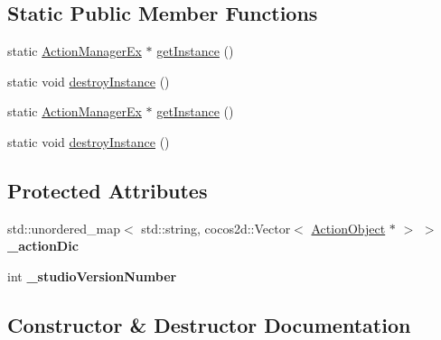 \subsection*{Static Public Member Functions}
\begin{DoxyCompactItemize}
\item 
static \hyperlink{classcocostudio_1_1ActionManagerEx}{Action\+Manager\+Ex} $\ast$ \hyperlink{classcocostudio_1_1ActionManagerEx_a463950006b48c1e0eb1062aa58639acd}{get\+Instance} ()
\item 
static void \hyperlink{classcocostudio_1_1ActionManagerEx_a372f3d9098b43c6db97104f98d29fcb1}{destroy\+Instance} ()
\item 
static \hyperlink{classcocostudio_1_1ActionManagerEx}{Action\+Manager\+Ex} $\ast$ \hyperlink{classcocostudio_1_1ActionManagerEx_ab7e5f5a0a4fe860bbd3b64b2d257359a}{get\+Instance} ()
\item 
static void \hyperlink{classcocostudio_1_1ActionManagerEx_a3d310075d8ed56579b0b4ecfb89b1aa6}{destroy\+Instance} ()
\end{DoxyCompactItemize}
\subsection*{Protected Attributes}
\begin{DoxyCompactItemize}
\item 
\mbox{\label{classcocostudio_1_1ActionManagerEx_a8f949d2047ad8ec0a2b335ecf9084bba}} 
std\+::unordered\+\_\+map$<$ std\+::string, cocos2d\+::\+Vector$<$ \hyperlink{classcocostudio_1_1ActionObject}{Action\+Object} $\ast$ $>$ $>$ {\bfseries \+\_\+action\+Dic}
\item 
\mbox{\label{classcocostudio_1_1ActionManagerEx_ab34e58ee8183c9bbf7a6a7bb987cfd32}} 
int {\bfseries \+\_\+studio\+Version\+Number}
\end{DoxyCompactItemize}


\subsection{Constructor \& Destructor Documentation}
\mbox{\label{classcocostudio_1_1ActionManagerEx_adf660952e77be05f9a9d22fcffaae3cc}} 
